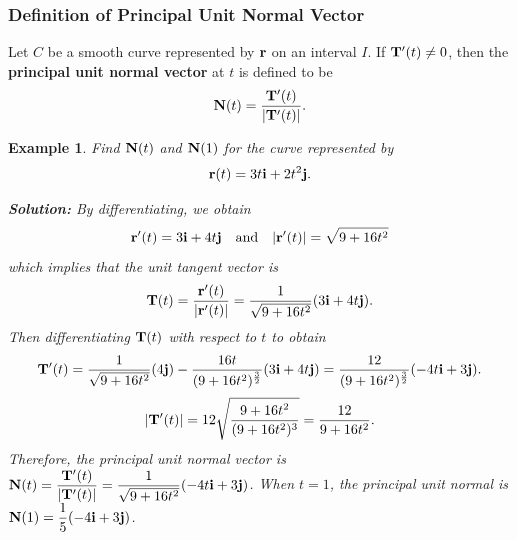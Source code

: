 \documentclass[titlepage,a4paper,12pt]{report}
\newtheorem{example}{Example}[section]
\begin{document}
\subsubsection{Definition of Principal Unit Normal Vector}
Let $C$ be a smooth curve represented by ${\bf{r}}$ on an interval $I$. If ${\bf{T}}'(t)\neq 0$, then the \textbf{principal unit normal vector} at $t$ is defined to be 
\[{\bf{N}}(t)=\dfrac{{\bf{T}}'(t)}{|{\bf{T}}'(t)|}.\]
\begin{example}
Find ${\bf{N}}(t)$ and ${\bf{N}}(1)$ for the curve represented by 
\[{\bf{r}}(t)=3t{\bf{i}}+2t^2{\bf{j}}.\]

\noindent \textbf{Solution:} By differentiating, we obtain 
\[{\bf{r}}'(t)=3{\bf{i}}+4t{\bf{j}} \quad \mbox{and} \quad |{\bf{r}}'(t)|=\sqrt{9+16t^2}\]
which implies that the unit tangent vector is 
\[{\bf{T}}(t)=\dfrac{{\bf{r}}'(t)}{|{\bf{r}}'(t)|}=\dfrac{1}{\sqrt{9+16t^2}}(3{\bf{i}}+4t{\bf{j}}).\]
Then differentiating ${\bf{T}}(t)$ with respect to $t$ to obtain
\[{\bf{T}}'(t)=\dfrac{1}{\sqrt{9+16t^2}}(4{\bf{j}})-\dfrac{16t}{(9+16t^2)^{\frac{3}{2}}}(3{\bf{i}}+4t{\bf{j}})=\dfrac{12}{(9+16t^2)^{\frac{3}{2}}}(-4t{\bf{i}}+3{\bf{j}}).\]
\[|{\bf{T}}'(t)|=12\sqrt{\dfrac{9+16t^2}{(9+16t^2)^3}}=\dfrac{12}{9+16t^2}.\]
Therefore, the principal unit normal vector is ${\bf{N}}(t)=\dfrac{{\bf{T}}'(t)}{|{\bf{T}}'(t)|}=\dfrac{1}{\sqrt{9+16t^2}}(-4t{\bf{i}}+3{\bf{j}})$. When $t=1$, the principal unit normal is ${\bf{N}}(1)=\dfrac{1}{5}(-4{\bf{i}}+3{\bf{j}})$.
\end{example}
\end{document}

